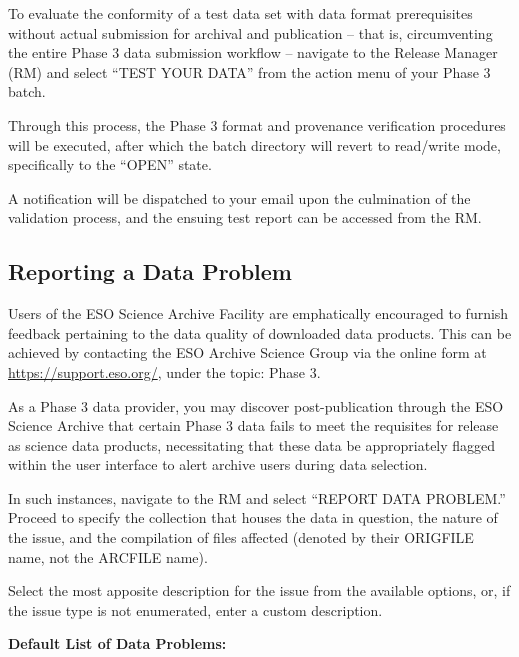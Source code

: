 \documentclass[a4paper,10pt]{book}
\begin{document}
To evaluate the conformity of a test data set with data format prerequisites without actual submission for archival and publication -- that is, circumventing the entire Phase 3 data submission workflow -- navigate to the Release Manager (RM) and select ``TEST YOUR DATA'' from the action menu of your Phase 3 batch.

Through this process, the Phase 3 format and provenance verification procedures will be executed, after which the batch directory will revert to read/write mode, specifically to the ``OPEN'' state.

A notification will be dispatched to your email upon the culmination of the validation process, and the ensuing test report can be accessed from the RM.

\subsection{Reporting a Data Problem}

Users of the ESO Science Archive Facility are emphatically encouraged to furnish feedback pertaining to the data quality of downloaded data products. This can be achieved by contacting the ESO Archive Science Group via the online form at \url{https://support.eso.org/}, under the topic: Phase 3.

As a Phase 3 data provider, you may discover post-publication through the ESO Science Archive that certain Phase 3 data fails to meet the requisites for release as science data products, necessitating that these data be appropriately flagged within the user interface to alert archive users during data selection.

In such instances, navigate to the RM and select ``REPORT DATA PROBLEM.'' Proceed to specify the collection that houses the data in question, the nature of the issue, and the compilation of files affected (denoted by their ORIGFILE name, not the ARCFILE name).

Select the most apposite description for the issue from the available options, or, if the issue type is not enumerated, enter a custom description.

\textbf{Default List of Data Problems:}
\end{document}
